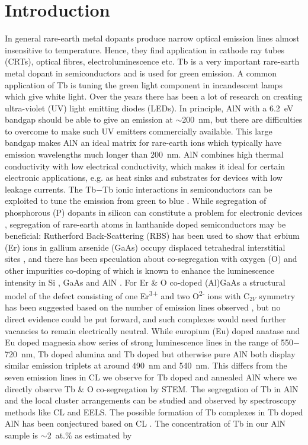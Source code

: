 \documentclass[%
aip,
rsi,%
 amsmath,amssymb,%
 reprint,%
]{revtex4-1}
\begin{document}
\section{Introduction}
\label{sec:Intro}

In general rare-earth metal dopants\cite{Kenyon2003,Kenyon2002} produce narrow optical emission lines almost insensitive to temperature. Hence, they find application in cathode ray tubes (CRTs), optical fibres, electroluminescence etc\cite{Aitasalo2003}. Tb is a very important rare-earth metal dopant in semiconductors and is used for green emission. A common application of Tb is tuning the green light component in incandescent lamps which give white light. Over the years there has been a lot of research on creating ultra-violet (UV) light emitting diodes (LEDs). In principle, AlN with a 6.2~eV bandgap should be able to give an emission at $\sim$200~nm, but there are difficulties to overcome to make such UV emitters commercially available. This large bandgap makes AlN an ideal matrix for rare-earth ions which typically have emission wavelengths much longer than 200~nm. AlN combines high thermal conductivity with low electrical conductivity, which makes it ideal for certain electronic applications, e.g. as heat sinks and substrates for devices with low leakage currents. The Tb$-$Tb ionic interactions in semiconductors can be exploited to tune the emission from green to blue \cite{Benz2013}. While segregation of phosphorous (P) dopants in silicon can constitute a problem for electronic devices \cite{Keizer2015}, segregation of rare-earth atoms in lanthanide doped semiconductors may be beneficial: Rutherford Back-Scattering (RBS) has been used to show that erbium (Er) ions in gallium arsenide (GaAs) occupy displaced tetrahedral interstitial sites \cite{Takahei1994,Zavada1995}, and there has been speculation about co-segregation with oxygen (O) and other impurities co-doping of which is known to enhance the luminescence intensity in Si \cite{Michel1991}, GaAs \cite{Zavada1995} and AlN \cite{Oliveira2004}. For Er \& O co-doped (Al)GaAs a structural model of the defect consisting of one Er\textsuperscript{3+} and two O\textsuperscript{2-} ions with C$_{2V}$ symmetry has been suggested based on the number of emission lines observed \cite{Takahei1994}, but no direct evidence could be put forward, and such complexes would need further vacancies to remain electrically neutral. While europium (Eu) doped anatase \cite{Pal2012} and Eu doped magnesia \cite{Rastogi2015} show series of strong luminescence lines in the range of 550$-$720~nm, Tb doped alumina \cite{Penilla2013} and Tb doped but otherwise pure AlN \cite{Wieg2012} both display similar emission triplets at around 490~nm and 540~nm. This differs from the seven emission lines in CL we observe for Tb doped and annealed AlN where we directly observe Tb \& O co-segregation by STEM. The segregation of Tb in AlN and the local cluster arrangements can be studied and observed by spectroscopy methods like CL and EELS. The possible formation of Tb complexes in Tb doped AlN has been conjectured based on CL \cite{Benz2013_AlNTb}. The concentration of Tb in our AlN sample is $\sim$2~at.\% as estimated by 
\end{document}
